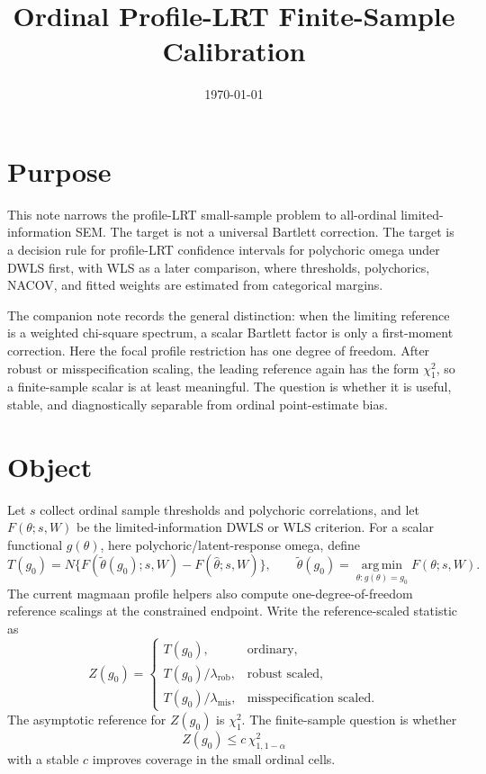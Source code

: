 \documentclass[11pt]{article}
\title{Ordinal Profile-LRT Finite-Sample Calibration}
\author{}
\date{\today}
\newcommand{\argmin}{\operatorname*{arg\,min}}
\theoremstyle{plain}
\theoremstyle{remark}
\begin{document}
\maketitle

\section*{Purpose}

This note narrows the profile-LRT small-sample problem to all-ordinal
limited-information SEM. The target is not a universal Bartlett correction.
The target is a decision rule for profile-LRT confidence intervals for
polychoric omega under DWLS first, with WLS as a later comparison, where
thresholds, polychorics, NACOV, and fitted weights are estimated from
categorical margins.

The companion note \cite{profilebartlettnote} records the general distinction:
when the limiting reference is a weighted chi-square spectrum, a scalar
Bartlett factor is only a first-moment correction. Here the focal profile
restriction has one degree of freedom. After robust or misspecification scaling,
the leading reference again has the form $\chi^2_1$, so a finite-sample scalar is
at least meaningful. The question is whether it is useful, stable, and
diagnostically separable from ordinal point-estimate bias.

\section{Object}

Let $s$ collect ordinal sample thresholds and polychoric correlations, and let
$F(\theta;s,W)$ be the limited-information DWLS or WLS criterion. For a scalar
functional $g(\theta)$, here polychoric/latent-response omega, define
\[
T(g_0) =
  N\{F(\tilde\theta(g_0);s,W) - F(\hat\theta;s,W)\},
\qquad
\tilde\theta(g_0)=\argmin_{\theta:g(\theta)=g_0} F(\theta;s,W).
\]
The current magmaan profile helpers also compute one-degree-of-freedom reference
scalings at the constrained endpoint. Write the reference-scaled statistic as
\[
Z(g_0) =
\begin{cases}
T(g_0), & \text{ordinary},\\
T(g_0)/\lambda_{\mathrm{rob}}, & \text{robust scaled},\\
T(g_0)/\lambda_{\mathrm{mis}}, & \text{misspecification scaled}.
\end{cases}
\]
The asymptotic reference for $Z(g_0)$ is $\chi^2_1$. The finite-sample question
is whether
\[
  Z(g_0) \le c\,\chi^2_{1,1-\alpha}
\]
with a stable $c$ improves coverage in the small ordinal cells.
\end{document}
